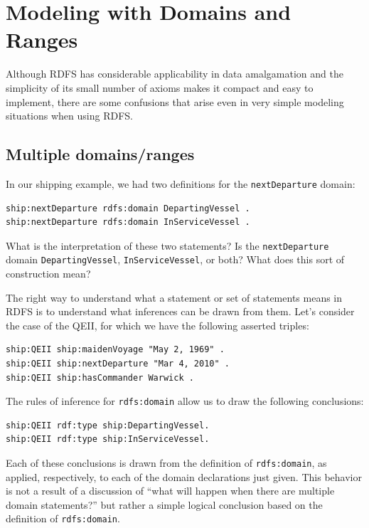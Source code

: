 \section{Modeling with Domains and Ranges}

Although RDFS has considerable applicability in data amalgamation and
the simplicity of its small number of axioms makes it compact and easy
to implement, there are some confusions that arise even in very simple
modeling situations when using RDFS.

\subsection{Multiple domains/ranges}

In our shipping example, we had two definitions for the \texttt{nextDeparture}
domain:

\begin{lstlisting}
ship:nextDeparture rdfs:domain DepartingVessel .
ship:nextDeparture rdfs:domain InServiceVessel .
\end{lstlisting}

What is the interpretation of these two statements? Is the \texttt{nextDeparture}
domain \texttt{DepartingVessel}, \texttt{InServiceVessel}, or both? What does this sort of
construction mean?

The right way to understand what a statement or set of statements means
in RDFS is to understand what inferences can be drawn from them. Let's
consider the case of the QEII, for which we have the following asserted
triples:

\begin{lstlisting}
ship:QEII ship:maidenVoyage "May 2, 1969" .
ship:QEII ship:nextDeparture "Mar 4, 2010" .
ship:QEII ship:hasCommander Warwick .
\end{lstlisting}

The rules of inference for \texttt{rdfs:domain} allow us to draw the following
conclusions:

\begin{lstlisting}
ship:QEII rdf:type ship:DepartingVessel.
ship:QEII rdf:type ship:InServiceVessel.
\end{lstlisting}

Each of these conclusions is drawn from the definition of \texttt{rdfs:domain},
as applied, respectively, to each of the domain declarations just given.
This behavior is not a result of a discussion of ``what will happen when
there are multiple domain statements?'' but rather a simple logical
conclusion based on the definition of \texttt{rdfs:domain}.

